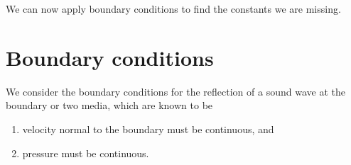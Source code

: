 We can now apply boundary conditions to find the constants we are missing.
%
%
\section{Boundary conditions}

We consider the boundary conditions for the reflection of a sound wave at the boundary or two media, which are known \parencite[$\S 11$]{sen14acoustics} to be
\begin{enumerate}[label=(\roman*)]
  \item velocity normal to the boundary must be continuous, and
  \item pressure must be continuous.
\end{enumerate}

